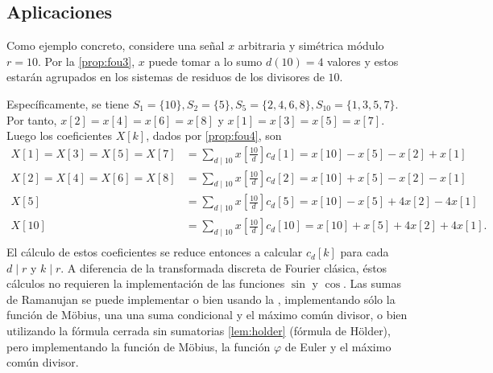 \subsection{Aplicaciones}

\begin{example}
Como ejemplo concreto, considere una señal $x$ arbitraria y simétrica módulo $r=10$. Por la \cref{prop:fou3}, $x$ puede tomar a lo sumo $d(10)=4$ valores y estos estarán agrupados en los sistemas de residuos de los divisores de $10$.
\bigskip

Específicamente, se tiene $S_1 = \{ 10 \}, S_2 = \{ 5 \}, S_5 = \{ 2, 4, 6, 8 \}, S_{10} = \{ 1, 3, 5, 7 \}$. Por tanto, $x[2]=x[4]=x[6]=x[8]$ y $x[1]=x[3]=x[5]=x[7]$. Luego los coeficientes $X[k]$, dados por \ref{prop:fou4}, son
\begin{align*}
    X[1] = X[3] = X[5] = X[7] & = \sum_{d \mid 10} x \left[ \frac{10}{d} \right] c_d[1] = x[10] - x[5] - x[2] + x[1] \\
    X[2] = X[4] = X[6] = X[8] & = \sum_{d \mid 10} x \left[ \frac{10}{d} \right] c_d[2] = x[10] + x[5] - x[2] - x[1] \\
    X[5] & = \sum_{d \mid 10} x \left[ \frac{10}{d} \right] c_d[5] = x[10] - x[5] + 4 x[2] - 4 x[1] \\
    X[10] & = \sum_{d \mid 10} x \left[ \frac{10}{d} \right] c_d[10] = x[10] + x[5] + 4 x[2] + 4 x[1]. \\
\end{align*}
El cálculo de estos coeficientes se reduce entonces a calcular $c_d[k]$ para cada $d \mid r$ y $k \mid r$. A diferencia de la transformada discreta de Fourier clásica, éstos cálculos no requieren la implementación de las funciones $\sin$ y $\cos$. Las sumas de Ramanujan se puede implementar o bien usando la , implementando sólo la función de Möbius, una una suma condicional y el máximo común divisor, o bien utilizando la fórmula cerrada sin sumatorias \ref{lem:holder} (fórmula de Hölder), pero implementando la función de Möbius, la función $\varphi$ de Euler y el máximo común divisor.
\end{example}


